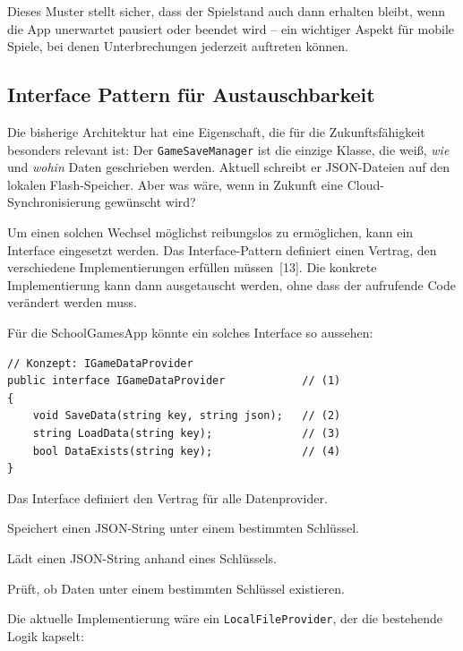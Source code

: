 \documentclass[12pt,a4paper]{article}
\begin{document}
Dieses Muster stellt sicher, dass der Spielstand auch dann erhalten bleibt, wenn die App unerwartet pausiert oder beendet wird -- ein wichtiger Aspekt für mobile Spiele, bei denen Unterbrechungen jederzeit auftreten können.

\subsection{Interface Pattern für Austauschbarkeit}

Die bisherige Architektur hat eine Eigenschaft, die für die Zukunftsfähigkeit besonders relevant ist: Der \texttt{GameSaveManager} ist die einzige Klasse, die weiß, \textit{wie} und \textit{wohin} Daten geschrieben werden. Aktuell schreibt er JSON-Dateien auf den lokalen Flash-Speicher. Aber was wäre, wenn in Zukunft eine Cloud-Synchronisierung gewünscht wird?

Um einen solchen Wechsel möglichst reibungslos zu ermöglichen, kann ein Interface eingesetzt werden. Das Interface-Pattern definiert einen Vertrag, den verschiedene Implementierungen erfüllen müssen~[13]. Die konkrete Implementierung kann dann ausgetauscht werden, ohne dass der aufrufende Code verändert werden muss.

Für die SchoolGamesApp könnte ein solches Interface so aussehen:

\begin{lstlisting}
// Konzept: IGameDataProvider
public interface IGameDataProvider            // (1)
{
    void SaveData(string key, string json);   // (2)
    string LoadData(string key);              // (3)
    bool DataExists(string key);              // (4)
}
\end{lstlisting}

\begin{description}[leftmargin=2em, labelwidth=1.5em]
    \item[(1)] Das Interface definiert den Vertrag für alle Datenprovider.
    \item[(2)] Speichert einen JSON-String unter einem bestimmten Schlüssel.
    \item[(3)] Lädt einen JSON-String anhand eines Schlüssels.
    \item[(4)] Prüft, ob Daten unter einem bestimmten Schlüssel existieren.
\end{description}

Die aktuelle Implementierung wäre ein \texttt{LocalFileProvider}, der die bestehende Logik kapselt:
\end{document}
